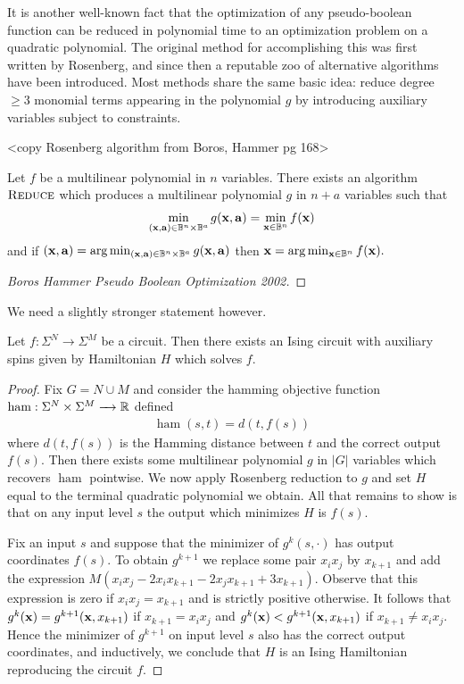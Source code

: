 \documentclass{amsart}
\begin{document}
It is another well-known fact that the optimization of any pseudo-boolean function can be reduced in polynomial time to an optimization problem on a quadratic polynomial. The original method for accomplishing this was first written by Rosenberg, and since then a reputable zoo of alternative algorithms have been introduced. Most methods share the same basic idea: reduce degree $\geq 3$ monomial terms appearing in the polynomial $g$ by introducing auxiliary variables subject to constraints.

<copy Rosenberg algorithm from Boros, Hammer pg 168>

\begin{thm}\label{thm:rosenberg-reduction}
  Let $f$ be a multilinear polynomial in $n$ variables. There exists an algorithm $\textsc{Reduce}$ which produces a multilinear polynomial $g$ in $n + a$ variables such that
  \begin{align*}
    \min_{(\bfx, \bfa) \in \bB^n \times \bB^a} g(\bfx, \bfa) = \min_{\bfx \in \bB^n} f(\bfx)
  \end{align*}
  and if $(\bfx, \bfa) = \arg\min_{(\bfx, \bfa) \in \bB^n \times \bB^a} g(\bfx, \bfa)$ then $\bfx = \arg\min_{\bfx \in \bB^n} f(\bfx).$
\end{thm}
\begin{proof}
  [Boros Hammer Pseudo Boolean Optimization 2002]
\end{proof}
We need a slightly stronger statement however.
\begin{thm}
  Let $f:\Sigma^N \to \Sigma^M$ be a circuit. Then there exists an Ising circuit with auxiliary spins given by Hamiltonian $H$ which solves $f$.
\end{thm}
\begin{proof}
  Fix $G = N \cup M$ and consider the hamming objective function $\operatorname{ham}:\Sigma^N\times \Sigma^M\to \bR$ defined
  \begin{align*}
    \operatorname{ham}(s,t) = d(t, f(s))
  \end{align*}
  where $d(t, f(s))$ is the Hamming distance between $t$ and the correct output $f(s)$. Then there exists some multilinear polynomial $g$ in $|G|$ variables which recovers $\operatorname{ham}$ pointwise. We now apply Rosenberg reduction to $g$ and set $H$ equal to the terminal quadratic polynomial we obtain. All that remains to show is that on any input level $s$ the output which minimizes $H$ is $f(s)$.

  Fix an input $s$ and suppose that the minimizer of $g^k(s, \cdot)$ has output coordinates $f(s)$. To obtain $g^{k+1}$ we replace some pair $x_ix_j$ by $x_{k+1}$ and add the expression $M(x_ix_j - 2x_ix_{k+1} - 2x_jx_{k+1} + 3x_{k+1})$. Observe that this expression is zero if $x_ix_j = x_{k+1}$ and is strictly positive otherwise. It follows that $g^k(\mathbf{x}) = g^{k+1}(\mathbf{x}, x_{k+1})$ if $x_{k+1} = x_ix_j$ and $g^k(\mathbf{x}) < g^{k+1}(\mathbf{x}, x_{k+1})$ if $x_{k+1} \neq x_ix_j$. Hence the minimizer of $g^{k+1}$ on input level $s$ also has the correct output coordinates, and inductively, we conclude that $H$ is an Ising Hamiltonian reproducing the circuit $f$.
\end{proof}
\newpage


\end{document}
